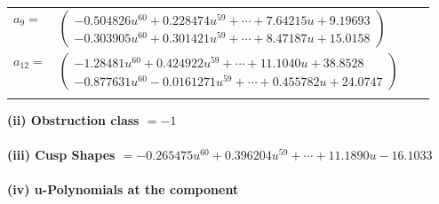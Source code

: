 \documentclass[1p]{elsarticle_modified}
\theoremstyle{definition}
\begin{document}
\begin{tabular}{m{7pt} m{180pt} m{7pt} m{180pt} }
\flushright $a_{9}=$&$\begin{pmatrix}-0.504826 u^{60}+0.228474 u^{59}+\cdots+7.64215 u+9.19693\\-0.303905 u^{60}+0.301421 u^{59}+\cdots+8.47187 u+15.0158\end{pmatrix}$ \\
\flushright $a_{12}=$&$\begin{pmatrix}-1.28481 u^{60}+0.424922 u^{59}+\cdots+11.1040 u+38.8528\\-0.877631 u^{60}-0.0161271 u^{59}+\cdots+0.455782 u+24.0747\end{pmatrix}$\\&\end{tabular}
\flushleft \textbf{(ii) Obstruction class $= -1$}\\~\\
\flushleft \textbf{(iii) Cusp Shapes $= -0.265475 u^{60}+0.396204 u^{59}+\cdots+11.1890 u-16.1033$}\\~\\
\newpage\renewcommand{\arraystretch}{1}
\flushleft \textbf{(iv) u-Polynomials at the component}\newline \\
\end{document}
